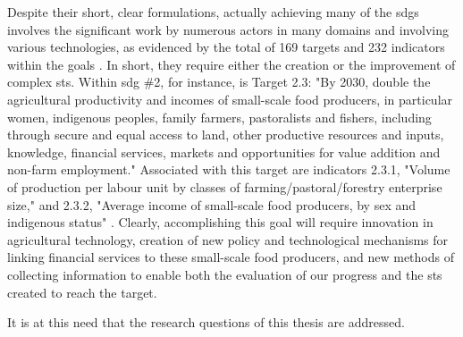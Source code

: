 Despite their short, clear formulations, actually achieving many of the \acp{sdg} involves the significant work by numerous actors in many domains and involving various technologies, as evidenced by the total of 169 targets and  232 indicators within the goals \cite{unitednationsgeneralassemblyGlobalIndicatorFramework2017}. In short, they require either the creation or the improvement of complex \ac{sts}. Within \ac{sdg} \#2, for instance, is Target 2.3: "By 2030, double the agricultural productivity and incomes of small-scale food producers, in particular women, indigenous peoples, family farmers, pastoralists and fishers, including through secure and equal access to land, other productive resources and inputs, knowledge, financial services, markets and opportunities for value addition and non-farm employment." Associated with this target are indicators 2.3.1, "Volume of production per labour unit by classes of farming/pastoral/forestry enterprise size," and 2.3.2, "Average income of small-scale food producers, by sex and indigenous status" \cite{unitednationsgeneralassemblyGlobalIndicatorFramework2017}. Clearly, accomplishing this goal will require innovation in agricultural technology, creation of new policy and technological mechanisms for linking financial services to these small-scale food producers, and new methods of collecting information to enable both the evaluation of our progress and the \ac{sts} created to reach the target. 



It is at this need that the research questions of this thesis are addressed.


\subsection{} \label{sec:remote}


